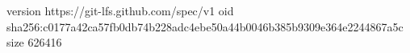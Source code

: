 version https://git-lfs.github.com/spec/v1
oid sha256:c0177a42ca57fb0db74b228adc4ebe50a44b0046b385b9309e364e2244867a5c
size 626416
